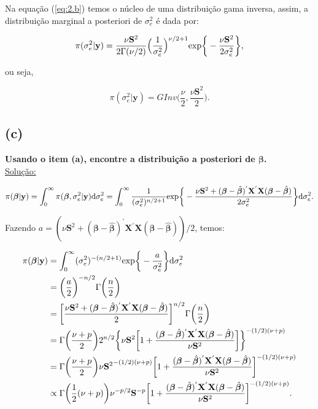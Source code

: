 \documentclass[12pt, oldfontcommands]{article}\usepackage[]{graphicx}\usepackage[]{color}
\begin{document}
Na equação (\ref{eq:2.b}) temos o núcleo de uma distribuição gama
inversa, assim, a distribuição marginal a posteriori de
\(\sigma_{e}^{2}\) é dada por:

\[ \pi(\sigma_{e}^{2}|\mathbf{y}) =
   \frac{\nu \mathbf{S}^{2}}{2 \Gamma(\nu/2)}
   \Big(\frac{1}{\sigma_{e}^{2}}\Big)^{\nu/2 + 1}
   {\rm exp}\bigg\{-\frac{\nu \mathbf{S}^{2}}{2\sigma_{e}^{2}}\bigg\}, \]

ou seja,

\[ \pi(\sigma_{e}^{2}|\mathbf{y}) =
   GInv\bigg(\frac{\nu}{2}, \frac{\nu \mathbf{S}^{2}}{2}\bigg). \]

\subsection*{(c)} 

\textbf{Usando o item (a), encontre a distribuição a posteriori de
        \(\bm{\beta}\).} \\
        
\underline{Solução:}

\[ \pi(\bm{\beta}|\mathbf{y}) =
   \int_{0}^{\infty} \pi(\bm{\beta}, \sigma_{e}^{2}|\mathbf{y})
   {\rm d}\sigma_{e}^{2} = \int_{0}^{\infty}
   \frac{1}{(\sigma_{e}^{2})^{n/2 + 1}}
   {\rm exp}\bigg\{-\frac{\nu \mathbf{S}^{2} +
   (\bm{\beta} - \hat{\bm{\beta}})^{'}\mathbf{X}^{'}\mathbf{X}(\bm{\beta}
   - \hat{\bm{\beta}})}{2\sigma_{e}^{2}} \bigg\}{\rm d}\sigma_{e}^{2}. \]

Fazendo \(a = (\nu \mathbf{S}^{2} +
(\bm{\beta} - \hat{\bm{\beta}})^{'}\mathbf{X}^{'}\mathbf{X}(\bm{\beta} -
\hat{\bm{\beta}}))/2\), temos:

\begin{align}
\begin{split}
 \pi(\bm{\beta}|\mathbf{y}) & = \int_{0}^{\infty}
 (\sigma_{e}^{2})^{-(n/2 + 1)}
 {\rm exp}\bigg\{-\frac{a}{\sigma_{e}^{2}}\bigg\}{\rm d}\sigma_{e}^{2} \\
 & = \bigg(\frac{a}{2}\bigg)^{-n/2}\Gamma\bigg(\frac{n}{2}\bigg) \\
 & = \bigg[\frac{\nu \mathbf{S}^{2} + (\bm{\beta} - \hat{\bm{\beta}})^{'}
     \mathbf{X}^{'}\mathbf{X}(\bm{\beta} - \hat{\bm{\beta}})}{2}
     \bigg]^{n/2} \Gamma\bigg(\frac{n}{2}\bigg) \\ & = \Gamma
 \bigg(\frac{\nu + p}{2}\bigg) 2^{n/2} \bigg\{\nu\mathbf{S}^{2}\bigg[
 1 + \frac{(\bm{\beta} - \hat{\bm{\beta}})^{'}
 \mathbf{X}^{'}\mathbf{X}(\bm{\beta} - \hat{\bm{\beta}})}{
 \nu\mathbf{S}^{2}}\bigg]\bigg\}^{-(1/2)(\nu + p)} \\ & = \Gamma
 \bigg(\frac{\nu + p}{2}\bigg) {\nu\mathbf{S}^{2}}^{-(1/2)(\nu + p)}
 \bigg[1 + \frac{(\bm{\beta} - \hat{\bm{\beta}})^{'}
 \mathbf{X}^{'}\mathbf{X}(\bm{\beta} - \hat{\bm{\beta}})}{
 \nu\mathbf{S}^{2}}\bigg]^{-(1/2)(\nu + p)} \label{eq:2.c} \\ & \propto
 \Gamma\bigg(\frac{1}{2}(\nu + p)\bigg) \nu^{-p/2}\mathbf{S}^{-p}
 \bigg[1 + \frac{(\bm{\beta} - \hat{\bm{\beta}})^{'}
 \mathbf{X}^{'}\mathbf{X}(\bm{\beta} - \hat{\bm{\beta}})}{
 \nu\mathbf{S}^{2}}\bigg]^{-(1/2)(\nu + p)}.
\end{split}
\end{align}
\end{document}
